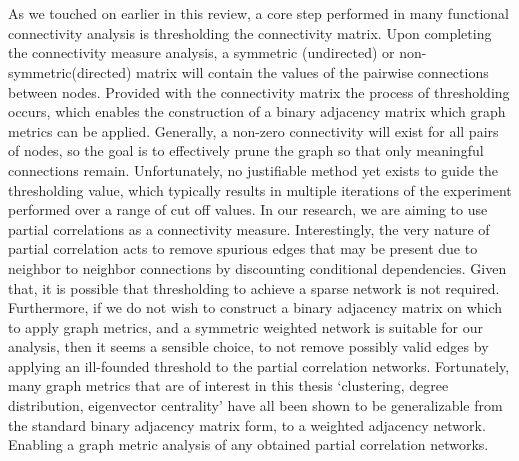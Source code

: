 \documentclass[11pt]{article}
\begin{document}
\\
\\
As we touched on earlier in this review, a core step performed in many functional connectivity analysis is thresholding the connectivity matrix. Upon completing the connectivity measure analysis, a symmetric (undirected) or non-symmetric(directed) matrix will contain the values of the pairwise connections between nodes. Provided with the connectivity matrix the process of thresholding occurs, which enables the construction of a binary adjacency matrix which graph metrics can be applied. Generally, a non-zero connectivity will exist for all pairs of nodes, so the goal is to effectively prune the graph so that only meaningful connections remain. Unfortunately, no justifiable method yet exists to guide the thresholding value, which typically results in multiple iterations of the experiment performed over a range of cut off values. In our research, we are aiming to use partial correlations as a connectivity measure. Interestingly, the very nature of partial correlation acts to remove spurious edges that may be present due to neighbor to neighbor connections by discounting conditional dependencies. Given that, it is possible that thresholding to achieve a sparse network is not required. Furthermore, if we do not wish to construct a binary adjacency matrix on which to apply graph metrics, and a symmetric weighted network is suitable for our analysis, then it seems a sensible choice, to not remove possibly valid edges by applying an ill-founded threshold to the partial correlation networks. Fortunately, many graph metrics that are of interest in this thesis `clustering, degree distribution, eigenvector centrality' have all been shown to be generalizable from the standard binary adjacency matrix form, to a weighted adjacency network. Enabling a graph metric analysis of any obtained partial correlation networks. 

\pagebreak

%


\end{document}
